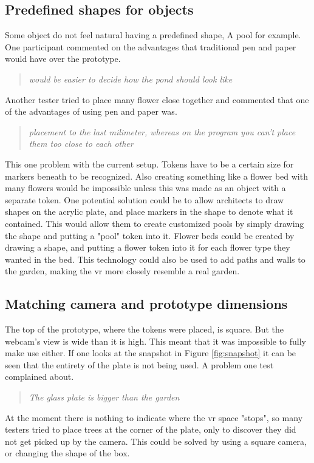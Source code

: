\subsection*{Predefined shapes for objects}
Some object do not feel natural having a predefined shape, A pool for example. One participant commented on the advantages that traditional pen and paper would have over the prototype.\\
\begin{quote}
	\textit{would be easier to decide how the pond should look like\\}
\end{quote}
Another tester tried to place many flower close together and commented that one of the advantages of using pen and paper was.\\
\begin{quote}
	\textit{placement to the last milimeter, whereas on the program you can't place them too close to each other\\}
\end{quote}
This one problem with the current setup. Tokens have to be a certain size for markers beneath to be recognized. Also creating something like a flower bed with many flowers would be impossible unless this was made as an object with a separate token. One potential solution could be to allow architects to draw shapes on the acrylic plate, and place markers in the shape to denote what it contained. This would allow them to create customized pools by simply drawing the shape and putting a "pool" token into it. Flower beds could be created by drawing a shape, and putting a flower token into it for each flower type they wanted in the bed. This technology could also be used to add paths and walls to the garden, making the vr more closely resemble a real garden.
\subsection*{Matching camera and prototype dimensions}
The top of the prototype, where the tokens were placed, is square. But the webcam's view is wide than it is high. This meant that it was impossible to fully make use either. If one looks at the snapshot in Figure \ref{fig:snapshot} it can be seen that the entirety of the plate is not being used. A problem one test complained about.\\
\begin{quote}
	\textit{The glass plate is bigger than the garden}\\
\end{quote}
At the moment there is nothing to indicate where the vr space "stops", so many testers tried to place trees at the corner of the plate, only to discover they did not get picked up by the camera. This could be solved by using a square camera, or changing the shape of the box.

